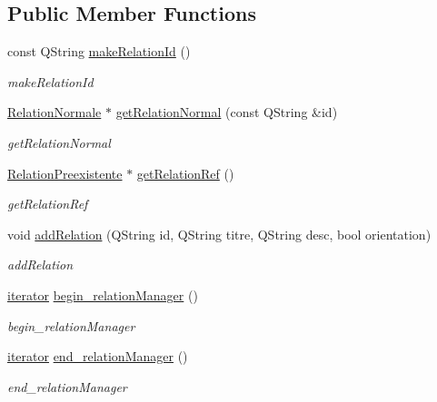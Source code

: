 \subsection*{Public Member Functions}
\begin{DoxyCompactItemize}
\item 
const Q\+String \hyperlink{class_relation_manager_a471597e36dfca1a02f44b2a9f9d78905}{make\+Relation\+Id} ()
\begin{DoxyCompactList}\small\item\em make\+Relation\+Id \end{DoxyCompactList}\item 
\hyperlink{class_relation_normale}{Relation\+Normale} $\ast$ \hyperlink{class_relation_manager_adff441859bebfc8d5397fee9115648e9}{get\+Relation\+Normal} (const Q\+String \&id)
\begin{DoxyCompactList}\small\item\em get\+Relation\+Normal \end{DoxyCompactList}\item 
\hyperlink{class_relation_preexistente}{Relation\+Preexistente} $\ast$ \hyperlink{class_relation_manager_a156576cea308ab2c9762fad3424d9a10}{get\+Relation\+Ref} ()
\begin{DoxyCompactList}\small\item\em get\+Relation\+Ref \end{DoxyCompactList}\item 
void \hyperlink{class_relation_manager_aa888ef6c6fe5842b178488fab0ffbec2}{add\+Relation} (Q\+String id, Q\+String titre, Q\+String desc, bool orientation)
\begin{DoxyCompactList}\small\item\em add\+Relation \end{DoxyCompactList}\item 
\hyperlink{class_relation_manager_1_1iterator}{iterator} \hyperlink{class_relation_manager_a3f648b67fc2b56c3b568cd4401d71ec9}{begin\+\_\+relation\+Manager} ()
\begin{DoxyCompactList}\small\item\em begin\+\_\+relation\+Manager \end{DoxyCompactList}\item 
\hyperlink{class_relation_manager_1_1iterator}{iterator} \hyperlink{class_relation_manager_aec143df4ff23e6f2c03e0fe3102728c9}{end\+\_\+relation\+Manager} ()
\begin{DoxyCompactList}\small\item\em end\+\_\+relation\+Manager \end{DoxyCompactList}\end{DoxyCompactItemize}
